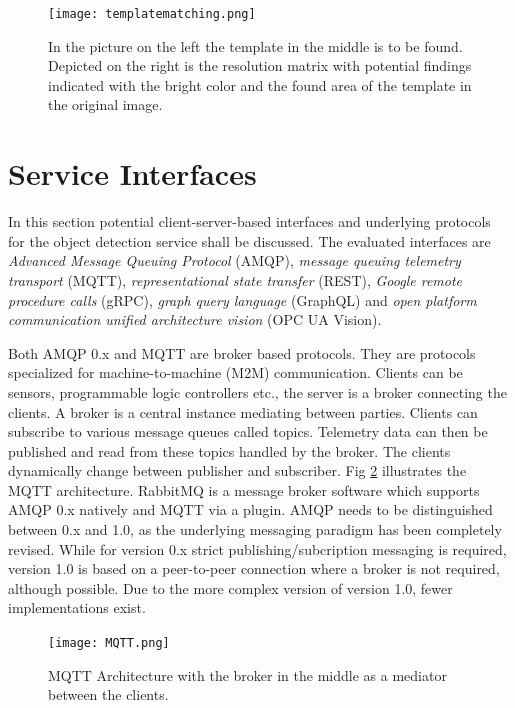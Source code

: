 \begin{figure}[ht]
	\centering
  \texttt{[image: templatematching.png]}
	\caption[Template Matching]{In the picture on the left the template in the middle is to be found. Depicted on the right is the resolution matrix with potential findings indicated with the bright color and the found area of the template in the original image.\cite{Documentation.LastVisited2018-11-15.2014TemplateMatching}}
	\label{templatematching}
\end{figure}

\section {Service Interfaces}
\label{serviceinterfaces}
In this section potential client-server-based interfaces and underlying protocols for the object detection service shall be discussed. The evaluated interfaces are \textit{Advanced Message Queuing Protocol} (AMQP), \textit{message queuing telemetry transport} (MQTT), \textit{representational state transfer} (REST), \textit{Google remote procedure calls} (gRPC), \textit{graph query language} (GraphQL) and \textit{open platform communication unified architecture vision} (OPC UA Vision). 

Both AMQP 0.x and MQTT are broker based protocols. They are protocols specialized for machine-to-machine (M2M) communication. Clients can be sensors, programmable logic controllers etc., the server is a broker connecting the clients. A broker is a central instance mediating between parties. Clients can subscribe to various message queues called topics. Telemetry data can then be published and read from these topics handled by the broker. The clients dynamically change between publisher and subscriber. Fig \ref{MQTT} illustrates the MQTT architecture.  \cite{Banks2014MQTT3.1.1} RabbitMQ is a message broker software which supports AMQP 0.x natively and MQTT via a plugin. \cite{Lastvisited2018-15-122018WhichSupport} AMQP needs to be distinguished between 0.x and 1.0, as the underlying messaging paradigm has been completely revised. While for version 0.x strict publishing/subcription messaging is required, version 1.0 is based on a peer-to-peer connection where a broker is not required, although possible. Due to the more complex version of version 1.0, fewer implementations exist. \cite{Dizdarevic2018SurveyIntegration}

\begin{figure}[ht]
	\centering
  \texttt{[image: MQTT.png]}
	\caption[MQTT Architecture]{MQTT Architecture with the broker in the middle as a mediator between the clients.\cite{2018-11-24Pure-javascript-MQTT-broker}}
	\label{MQTT}
\end{figure}

